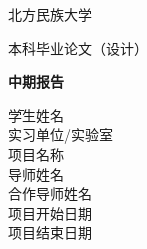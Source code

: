 \thispagestyle{empty}

{
\setlength{\parindent}{0em}
\renewcommand{\baselinestretch}{2}

\vspace*{6.3em}

{
\stxingkai\xiaochu
\centering
北方民族大学 \par
}

\vspace{1em}

{
\stxingkai\xiaochu
\centering
本科毕业论文（设计） \par
}

\vspace{1.5em}

{
\songti\erhao\bfseries
\centering
中期报告 \par
}

\vspace{7em}

{
\renewcommand{\baselinestretch}{1.65}
\songti\sanhao\bfseries
\begin{tabbing} \hspace{1em}
  \=  学生姓名 \hspace{4em} \= \underline{\makebox[16em]{\zjuauthornamec}} \\
  \> 实习单位/实验室 \> \underline{} \\
  \> 项目名称 \> \underline{\makebox[16em]{\zjutitlec}} \\
  \> 导师姓名 \> \underline{\makebox[16em]{\zjumentorc}} \\
  \> 合作导师姓名 \> \underline{\makebox[16em]{}} \\
  \> 项目开始日期 \> \underline{} \\
  \> 项目结束日期 \> \underline{} \par
\end{tabbing}
}
}

